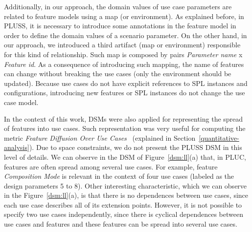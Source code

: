\documentclass{acm_proc_article-sp}
\begin{document}
Additionally, in our approach, the domain values of use
case parameters are related to feature models using a map (or environment).
As explained before, in PLUSS, it is necessary to introduce some annotations in the feature model in 
order to define the domain values of a scenario parameter. On the other hand, in our approach, we introduced 
a third artifact (map or environment) responsible for this kind of relationship. Such map is composed by pairs 
\emph{Parameter name} x \emph{Feature id}. As a consequence of introducing such mapping, the name of features can 
change without breaking the use cases (only the environment should be
updated). Because use cases do not have explicit references to SPL instances and
configurations, introducing new features or SPL instances do not change the use case model.




In the context of this work, DSMs were also applied for representing 
the spread of features into use cases. Such representation 
was very useful for computing the metric \emph{Feature Diffusion Over 
Use Cases}~\cite{garcia-taosd-2005} (explained in Section~\ref{quantitative-analysis}).  
Due to space constraints,  we do not present the PLUSS DSM in this level of details. 
We can observe in the DSM of Figure~\ref{dsm:ll}(a) that, in PLUC, features are often spread among several 
use cases. For example, feature \emph{Composition Mode} is relevant in the context of four use cases
(labeled as the design parameters 5 to 8). 
Other interesting characteristic, which we can
observe in the Figure~\ref{dsm:ll}(a), is that there is no dependences between use cases, since each use
case describes all of its extension points. However, it is not possible to specify two use
cases independently, since there is cyclical dependences between use cases and features and these features can be spread into several use cases.
\end{document}
